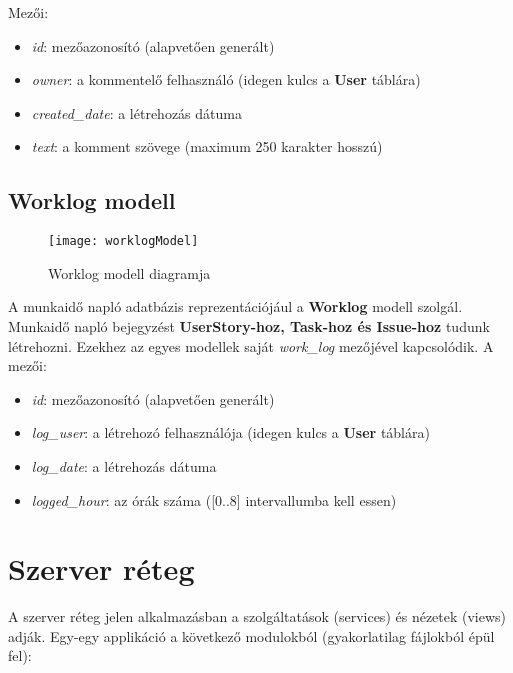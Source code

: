 Mezői:

\begin{itemize}
	\item \textit{id}: mezőazonosító (alapvetően generált)
	\item \textit{owner}: a kommentelő felhasználó (idegen kulcs a \textbf{User} táblára)
	\item \textit{created\_date}: a létrehozás dátuma
	\item \textit{text}: a komment szövege (maximum 250 karakter hosszú)
\end{itemize}

\subsection{Worklog modell}

\begin{figure}[H]
	\centering
	\texttt{[image: worklogModel]}
	\caption{Worklog modell diagramja}
	\label{fig:worklogmodel}
\end{figure}

A munkaidő napló adatbázis reprezentációjául a \textbf{Worklog} modell szolgál. Munkaidő napló bejegyzést \textbf{UserStory-hoz, Task-hoz és Issue-hoz} tudunk létrehozni. Ezekhez az egyes modellek saját \textit{work\_log} mezőjével kapcsolódik. A mezői:

\begin{itemize}
	\item \textit{id}: mezőazonosító (alapvetően generált)
	\item \textit{log\_user}: a létrehozó felhasználója (idegen kulcs a \textbf{User} táblára)
	\item \textit{log\_date}: a létrehozás dátuma
	\item \textit{logged\_hour}: az órák száma ([0..8] intervallumba kell essen)
\end{itemize}

\section{Szerver réteg}

A szerver réteg jelen alkalmazásban a szolgáltatások (services) és nézetek (views) adják. Egy-egy applikáció a következő modulokból (gyakorlatilag fájlokból épül fel):

